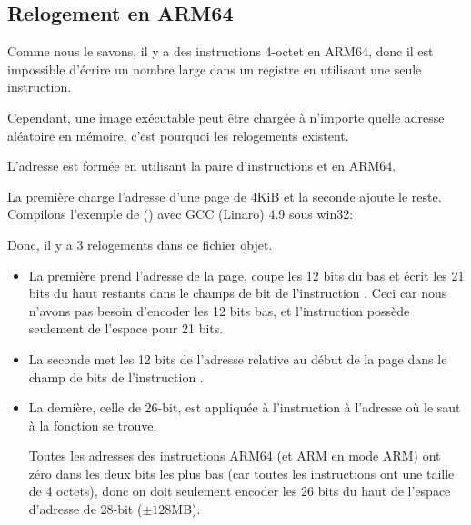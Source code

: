 ﻿\newcommand{\ARMELF}{\InSqBrackets{\emph{ELF for the ARM 64-bit Architecture (AArch64)}, (2013)}\footnote{\AlsoAvailableAs \url{http://infocenter.arm.com/help/topic/com.arm.doc.ihi0056b/IHI0056B_aaelf64.pdf}}}

\subsection{Relogement en ARM64}
\label{ARM64_relocs}

Comme nous le savons, il y a des instructions 4-octet en ARM64, donc il est impossible
d'écrire un nombre large dans un registre en utilisant une seule instruction.

Cependant, une image exécutable peut être chargée à n'importe quelle adresse aléatoire
en mémoire, c'est pourquoi les relogements existent.


L'adresse est formée en utilisant la paire d'instructions  et \ADD en ARM64.

La première charge l'adresse d'une page de 4KiB et la seconde ajoute le reste.
Compilons l'exemple de \q{\HelloWorldSectionName} () avec GCC (Linaro)
4.9 sous win32:



Donc, il y a 3 relogements dans ce fichier objet.

\begin{itemize}
\item 
La première prend l'adresse de la page, coupe les 12 bits du bas et écrit les 21 bits
du haut restants dans le champs de bit de l'instruction . Ceci car nous n'avons
pas besoin d'encoder les 12 bits bas, et l'instruction  possède seulement
de l'espace pour 21 bits.

\item 
La seconde met les 12 bits de l'adresse relative au début de la page dans le champ
de bits de l'instruction \ADD.

\item 
La dernière, celle de 26-bit, est appliquée à l'instruction à l'adresse 
où le saut à la fonction \printf se trouve.

Toutes les adresses des instructions ARM64 (et ARM en mode ARM) ont zéro dans les
deux bits les plus bas (car toutes les instructions ont une taille de 4 octets),
donc on doit seulement encoder les 26 bits du haut de l'espace d'adresse de 28-bit
($\pm 128$MB).

\end{itemize}

